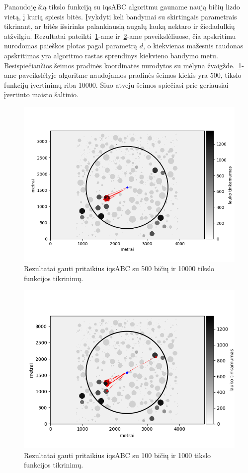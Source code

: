 \documentclass{VUMIFPSmagistrinis}
\begin{document}
Panaudoję šią tikslo funkciją su iqsABC algoritmu gauname naują bičių lizdo vietą, į kurią spiesis bitės. Įvykdyti keli bandymai su skirtingais parametrais tikrinant, ar bitės išsirinks palankiausią augalų lauką nektaro ir žiedadulkių atžvilgiu. Rezultatai pateikti~\ref{step1}-ame ir~\ref{step2}-ame paveikslėliuose, čia apskritimu nurodomas paieškos plotas pagal parametrą $d$, o kiekvienas mažesnis raudonas apskritimas yra algoritmo rastas sprendinys kiekvieno bandymo metu. Besispiečiančios šeimos pradinės koordinatės nurodytos su mėlyna žvaigžde.~\ref{step1}-ame paveikslėlyje algoritme naudojamos pradinės šeimos kiekis yra 500, tikslo funkcijų įvertinimų riba 10000. Šiuo atveju šeimos spiečiasi prie geriausiai įvertinto maisto šaltinio.



\begin{figure}
    \centering
    \includegraphics[scale=0.7]{img/new/step1.png}
    \caption{Rezultatai gauti  pritaikius iqsABC su 500 bičių ir 10000 tikslo funkcijos tikrinimų.}
    \label{step1}
\end{figure}

\begin{figure}
    \centering
    \includegraphics[scale=0.8]{img/new/step2.png}
    \caption{Rezultatai gauti  pritaikius iqsABC su 100 bičių ir 1000 tikslo funkcijos tikrinimų.}
    \label{step2}
\end{figure}
\end{document}
